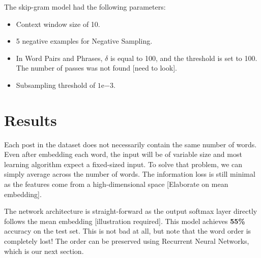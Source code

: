 The skip-gram model had the following parameters:
\begin{itemize}
    \item Context window size of 10.
    \item 5 negative examples for Negative Sampling.
    \item In Word Pairs and Phrases, $\delta$ is equal to 100, and the threshold is set to 100. The number of passes was not found [need to look].
    \item Subsampling threshold of $1\mathrm{e}{-3}.$
\end{itemize}

\section{Results}
Each post in the dataset does not necessarily contain the same number of words. Even after embedding each word, the input will be of variable size and most learning algorithm expect a fixed-sized input. To solve that problem, we can simply average across the number of words. The information loss is still minimal as the features come from a high-dimensional space \cite{seth1} [Elaborate on mean embedding].

The network architecture is straight-forward as the output softmax layer directly follows the mean embedding [illustration required]. This model achieves \textbf{55\%} accuracy on the test set. This is not bad at all, but note that the word order is completely lost! The order can be preserved using Recurrent Neural Networks, which is our next section.





